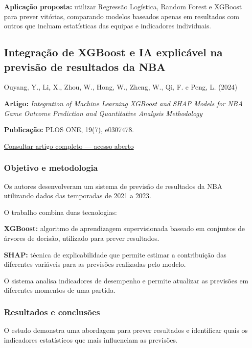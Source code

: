 \textbf{Aplicação proposta:} utilizar Regressão Logística, Random Forest
e XGBoost para prever vitórias, comparando modelos baseados apenas em
resultados com outros que incluam estatísticas das equipas e indicadores
individuais.

\subsection{Integração de XGBoost e IA explicável na previsão de
resultados da
NBA}\label{aautia:integrauxe7uxe3o-de-xgboost-e-ia-explicuxe1vel-na-previsuxe3o-de-resultados-da-nba}

Ouyang, Y., Li, X., Zhou, W., Hong, W., Zheng, W., Qi, F. e Peng, L.
(2024) \cite{ouyang2024}

\textbf{Artigo:} \emph{Integration of Machine Learning XGBoost and SHAP
Models for NBA Game Outcome Prediction and Quantitative Analysis
Methodology}

\textbf{Publicação:} PLOS ONE, 19(7), e0307478.

\href{https://doi.org/10.1371/journal.pone.0307478}{Consultar artigo
completo --- acesso aberto}

\subsubsection{Objetivo e metodologia}\label{aautia:objetivo-e-metodologia-1}

Os autores desenvolveram um sistema de previsão de resultados da NBA
utilizando dados das temporadas de 2021 a 2023.

O trabalho combina duas tecnologias:

\textbf{XGBoost:} algoritmo de aprendizagem supervisionada baseado em
conjuntos de árvores de decisão, utilizado para prever resultados.

\textbf{SHAP:} técnica de explicabilidade que permite estimar a
contribuição das diferentes variáveis para as previsões realizadas pelo
modelo.

O sistema analisa indicadores de desempenho e permite atualizar as
previsões em diferentes momentos de uma partida.

\subsubsection{Resultados e
conclusões}\label{aautia:resultados-e-conclusuxf5es}

O estudo demonstra uma abordagem para prever resultados e identificar
quais os indicadores estatísticos que mais influenciam as previsões.

